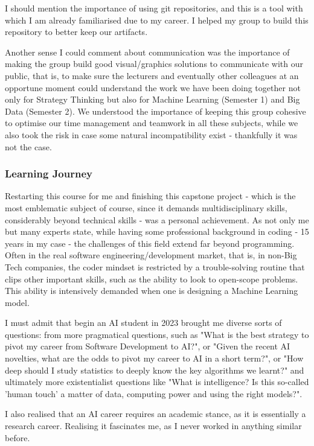 \documentclass{article}
\begin{document}
I should mention the importance of using git repositories, and this is a tool with which I am already familiarised due to my career. I helped my group to build this repository to better keep our artifacts.

Another sense I could comment about communication was the importance of making the group build good visual/graphics solutions to communicate with our public, that is, to make sure the lecturers and eventually other colleagues at an opportune moment could understand the work we have been doing together not only for Strategy Thinking but also for Machine Learning (Semester 1) and Big Data (Semester 2). We understood the importance of keeping this group cohesive to optimise our time management and teamwork in all these subjects, while we also took the risk in case some natural incompatibility exist - thankfully it was not the case.


\subsubsection{Learning Journey}
Restarting this course for me and finishing this capstone project - which is the most emblematic subject of course, since it demands multidisciplinary skills, considerably beyond technical skills - was a personal achievement. As not only me but many experts state, while having some professional background in coding - 15 years in my case - the challenges of this field extend far beyond programming. Often in the real software engineering/development market, that is, in non-Big Tech companies, the coder mindset is restricted by a trouble-solving routine that clips other important skills, such as the ability to look to open-scope problems. This ability is intensively demanded when one is designing a Machine Learning model.

I must admit that begin an AI student in 2023 brought me diverse sorts of questions: from more pragmatical questions, such as "What is the best strategy to pivot my career from Software Development to AI?", or "Given the recent AI novelties, what are the odds to pivot my career to AI in a short term?", or "How deep should I study statistics to deeply know the key algorithms we learnt?" and ultimately more existentialist questions like "What is intelligence? Is this so-called 'human touch' a matter of data, computing power and using the right models?".

I also realised that an AI career requires an academic stance, as it is essentially a research career. Realising it fascinates me, as I never worked in anything similar before.
\end{document}
